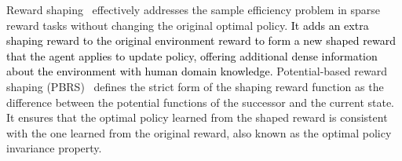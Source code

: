 \documentclass[journal]{IEEEtran}
\begin{document}
Reward shaping~\citep{ng1999policy, wiewiora2003principled, devlin2012dynamic, harutyunyan2015expressing} effectively addresses the sample efficiency problem in sparse reward tasks without changing the original optimal policy.
\textcolor{black}{It adds an extra shaping reward to the original environment reward to form a new shaped reward that the agent applies to update policy, offering additional dense information about the environment with human domain knowledge.}
Potential-based reward shaping (PBRS)~\citep{ng1999policy} defines the strict form of the shaping reward function as the difference between the potential functions of the successor and the current state. It ensures that the optimal policy learned from the shaped reward is consistent with the one learned from the original reward, also known as the optimal policy invariance property.
\end{document}
